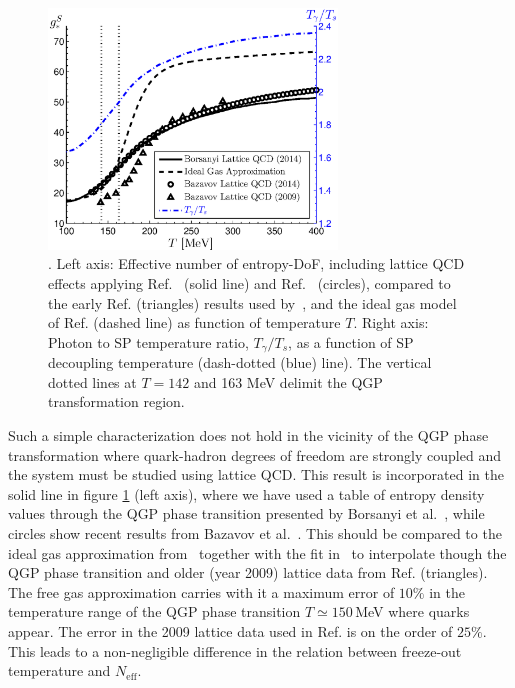 \begin{figure}\label{fig:gs}
\centering
\begin{minipage}[b]{.49\textwidth}
\centerline{\hspace*{-0.10cm}\includegraphics[height=6.4cm]{04-birrell/QGP_Neff/Figures/gS_T_ratio.eps}}
\end{minipage}
\caption{. Left axis: Effective number of entropy-DoF, including lattice QCD effects applying Ref.~\cite{Borsanyi:2013bia} (solid line) and  Ref.~\cite{Bazavov:2014pvz} (circles), compared to the early Ref.\cite{Bazavov:2009zn} (triangles) results used by~\cite{Anchordoqui:2011nh}, and the ideal gas model of Ref.\cite{Coleman:2003hs} (dashed line) as function of temperature $T$. Right axis: Photon to SP temperature ratio, $T_\gamma/T_s$, as a function of SP decoupling temperature (dash-dotted (blue) line). The vertical dotted lines at $T=142$ and 163 MeV delimit the QGP transformation region.\label{fig:gS}}
 \end{figure}

Such a simple characterization does not hold in the vicinity of the QGP phase transformation where  quark-hadron degrees of freedom are strongly coupled  and the system must be studied using lattice QCD. This result is incorporated in the solid line in figure \ref{fig:gS} (left axis), where we have used a table of entropy density values through the QGP phase transition presented by Borsanyi et al.~\cite{Borsanyi:2013bia}, while circles show recent results from Bazavov et al.~\cite{Bazavov:2014pvz}. This should be compared to the ideal gas approximation from~\cite{Coleman:2003hs} together with the fit in~\cite{Wantz:2009it} to interpolate though the QGP phase transition and older (year 2009) lattice data from Ref.\cite{Bazavov:2009zn} (triangles). The free gas approximation carries with it a maximum error of $10\%$ in the temperature range of the QGP phase transition  $T\simeq 150$\,MeV where quarks appear.  The error in the 2009 lattice data used in Ref.\cite{Anchordoqui:2011nh} is on the order of $25\%$.  This leads to a non-negligible difference in the relation between freeze-out temperature and $N_{\text{eff}}$.

